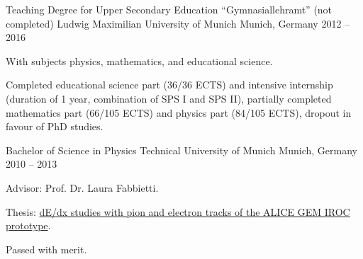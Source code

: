 \begin{cventries}
    \cventry
    {Teaching Degree for Upper Secondary Education “Gymnasiallehramt” (not completed)} %
    {Ludwig Maximilian University of Munich} %
    {Munich, Germany} %
    {2012 -- 2016} %
    {
      \begin{cvitems} %
        \item {With subjects physics, mathematics, and educational science.}
        \item {Completed educational science part (36/36 ECTS) and in­ten­si­ve in­ternship (duration of 1 year, com­bi­na­ti­on of SPS I and SPS II), partially completed mathematics part (66/105 ECTS) and physics part (84/105 ECTS), dropout in favour of PhD studies.}
      \end{cvitems}
    }

  \cventry
    {Bachelor of Science in Physics} %
    {Technical University of Munich} %
    {Munich, Germany} %
    {2010 -- 2013} %
    {
      \begin{cvitems} %
        \item {Advisor: Prof. Dr. Laura Fabbietti.}
        \item {Thesis: \href{https://www.das.ktas.ph.tum.de/DasDocs/Public/Bachelor_Theses/thesis_Gadow.pdf}{dE/dx studies with pion and electron tracks of the ALICE GEM IROC prototype}.}
        \item {Passed with merit.}
      \end{cvitems}
    }
\end{cventries}
